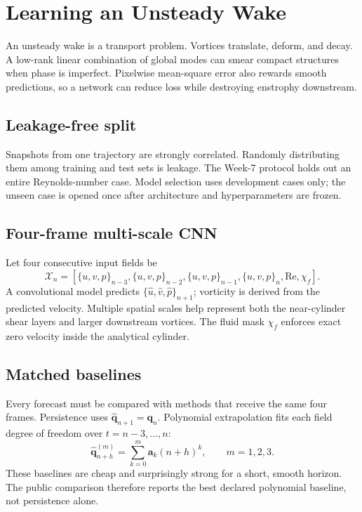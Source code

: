 \documentclass[11pt]{article}
\newcommand{\Rey}{\mathrm{Re}}
\begin{document}
\section{Learning an Unsteady Wake}
An unsteady wake is a transport problem. Vortices translate, deform, and decay. A low-rank linear combination of global modes can smear compact structures when phase is imperfect. Pixelwise mean-square error also rewards smooth predictions, so a network can reduce loss while destroying enstrophy downstream.

\subsection{Leakage-free split}
Snapshots from one trajectory are strongly correlated. Randomly distributing them among training and test sets is leakage. The Week-7 protocol holds out an entire Reynolds-number case. Model selection uses development cases only; the unseen case is opened once after architecture and hyperparameters are frozen.

\subsection{Four-frame multi-scale CNN}
Let four consecutive input fields be
\begin{equation}
\mathcal{X}_n=
\left[\{u,v,p\}_{n-3},\{u,v,p\}_{n-2},
\{u,v,p\}_{n-1},\{u,v,p\}_{n},\Rey,\chi_f\right].
\end{equation}
A convolutional model predicts $\{\widehat u,\widehat v,\widehat p\}_{n+1}$;
vorticity is derived from the predicted velocity. Multiple spatial scales help
represent both the near-cylinder shear layers and larger downstream vortices.
The fluid mask $\chi_f$ enforces exact zero velocity inside the analytical
cylinder.

\subsection{Matched baselines}
Every forecast must be compared with methods that receive the same four frames.
Persistence uses $\widehat{\bm{q}}_{n+1}=\bm{q}_n$. Polynomial extrapolation
fits each field degree of freedom over $t=n-3,\ldots,n$:
\begin{equation}
\widehat{\bm{q}}_{n+h}^{(m)}
=\sum_{k=0}^{m}\bm{a}_k(n+h)^k,\qquad m=1,2,3.
\end{equation}
These baselines are cheap and surprisingly strong for a short, smooth horizon.
The public comparison therefore reports the best declared polynomial baseline,
not persistence alone.
\end{document}
